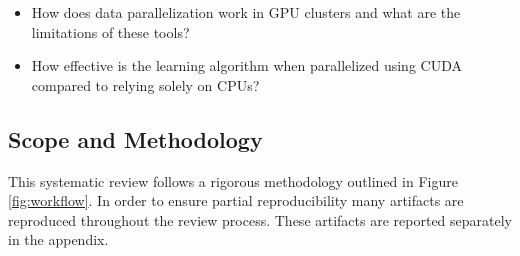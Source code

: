 \begin{itemize}
	\item How does data parallelization work in GPU clusters and what are the limitations of these tools?
	\item How effective is the learning algorithm when parallelized using CUDA compared to relying solely on
	      CPUs?
\end{itemize}




\subsection{Scope and Methodology}
This systematic review follows a rigorous methodology outlined in Figure \ref{fig:workflow}. In
order to ensure partial reproducibility many artifacts are reproduced throughout the review
process. These artifacts are reported separately in the appendix.

